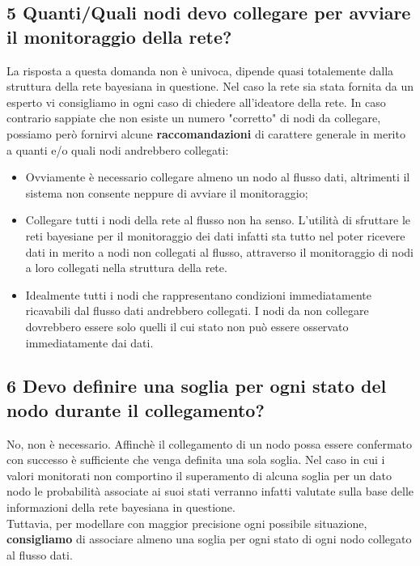 \subsection*{5 Quanti/Quali nodi devo collegare per avviare il monitoraggio della rete?}
La risposta a questa domanda non è univoca, dipende quasi totalemente dalla struttura della rete bayesiana in questione. Nel caso la rete sia stata fornita da un esperto vi consigliamo in ogni caso di chiedere all'ideatore della rete. In caso contrario sappiate che non esiste un numero "corretto" di nodi da collegare, possiamo però fornirvi alcune \textbf{raccomandazioni} di carattere generale in merito a quanti e/o quali nodi andrebbero collegati:
\begin{itemize}
	\item Ovviamente è necessario collegare almeno un nodo al flusso dati, altrimenti il sistema non consente neppure di avviare il monitoraggio;
	\item Collegare tutti i nodi della rete al flusso non ha senso. L'utilità di sfruttare le reti bayesiane per il monitoraggio dei dati infatti sta tutto nel poter ricevere dati in merito a nodi non collegati al flusso, attraverso il monitoraggio di nodi a loro collegati nella struttura della rete.
	\item Idealmente tutti i nodi che rappresentano condizioni immediatamente ricavabili dal flusso dati andrebbero collegati. I nodi da non collegare dovrebbero essere solo quelli il cui stato non può essere osservato immediatamente dai dati.
\end{itemize}

\subsection*{6 Devo definire una soglia per ogni stato del nodo durante il collegamento?}
No, non è necessario. Affinchè il collegamento di un nodo possa essere confermato con successo è sufficiente che venga definita una sola soglia. Nel caso in cui i valori monitorati non comportino il superamento di alcuna soglia per un dato nodo le probabilità associate ai suoi stati verranno infatti valutate sulla base delle informazioni della rete bayesiana in questione.\\
Tuttavia, per modellare con maggior precisione ogni possibile situazione, \textbf{consigliamo} di associare almeno una soglia per ogni stato di ogni nodo collegato al flusso dati.

